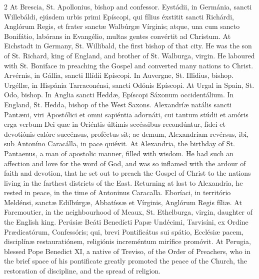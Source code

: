 \begin{paracol}{2}
\switchcolumn
{}
At Brescia, St. Apollonius, bishop 
 and confessor.
\switchcolumn*
{}
Eystádii, in Germánia, sancti Willebáldi, ejúsdem urbis primi Epíscopi, qui fílius 
 éxstitit sancti 
 Richárdi, Anglórum Regis, et frater sanctæ Walbúrgæ Vírginis; atque, una cum 
 sancto Bonifátio, labórans in Evangélio, multas gentes convértit ad Christum.
\switchcolumn
{}
At Eichstadt in Germany, St. 
 Willibald, the first bishop of that city. He was the son of St. 
 Richard, king of England, and brother of St. Walburga, virgin. He 
 laboured with St. Boniface in preaching the Gospel and converted many 
 nations to Christ.
\switchcolumn*
{}
Arvérnis, in Gállia, 
 sancti Illídii Epíscopi.
\switchcolumn
{}
In Auvergne, St. Illidius, bishop.
\switchcolumn*
{}
Urgéllæ, in Hispánia 
 Tarraconénsi, sancti Odónis Epíscopi.
\switchcolumn
{}
At Urgal in Spain, St. Odo, bishop.
\switchcolumn*
{}
In Anglia sancti Heddæ, 
 Epíscopi Sáxonum occidentálium.
\switchcolumn
{}
In England, St. Hedda, bishop of the 
 West Saxons.
\switchcolumn*
{}
Alexandríæ natális 
 sancti Pantæni, viri Apostólici et omni sapiéntia adornáti, cui tantum 
 stúdii et amóris erga verbum Dei quæ in Oriéntis últimis secéssibus 
 recondúntur, fídei et devotiónis calóre succénsus, proféctus sit; ac demum, 
 Alexandríam revérsus, ibi, sub Antoníno Caracálla, in pace quiévit.
\switchcolumn
{}
At Alexandria, the birthday of St. 
 Pantaenus, a man of apostolic manner, filled with wisdom. He had such 
 an affection and love for the word of God, and was so inflamed with the 
 ardour of faith and devotion, that he set out to preach the Gospel of Christ 
 to the nations living in the farthest districts of the East. Returning 
 at last to Alexandria, he rested in peace, in the time of Antoninus 
 Caracalla.
\switchcolumn*
{}
Eboríaci, in território Meldénsi, sanctæ Edilbúrgæ, Abbatíssæ et Vírginis, Anglórum Regis fíliæ.
\switchcolumn
{}
At Faremoutier, in the neighbourhood 
 of Meaux, St. Ethelburga, virgin, daughter of the English king.
\switchcolumn*
{}
Perúsiæ Beáti Benedícti 
 Papæ Undécimi, Tarvisíni, ex Ordine Prædicatórum, Confessóris; qui, brevi 
 Pontificátus sui spátio, Ecclésiæ pacem, disciplínæ restauratiónem, 
 religiónis increméntum mirífice promóvit.
\switchcolumn
{}
At Perugia, blessed Pope Benedict 
 XI, a native of Treviso, of the Order of Preachers, who in the brief space 
 of his pontificate greatly promoted the peace of the Church, the restoration 
 of discipline, and the spread of religion.
\switchcolumn*
{}
\end{paracol}


